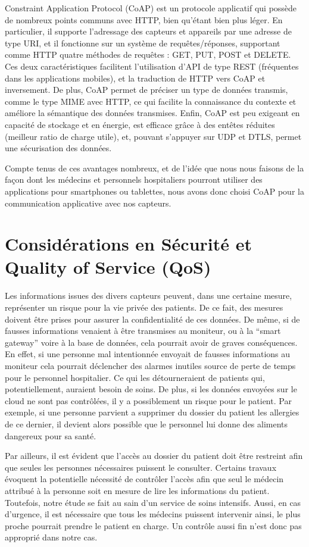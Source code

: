 \documentclass{article}
\begin{document}
Constraint Application Protocol (CoAP) est un protocole applicatif qui possède de nombreux points communs avec HTTP, bien qu’étant bien plus léger. En particulier, il supporte l’adressage des capteurs et appareils par une adresse de type URI, et il fonctionne sur un système de requêtes/réponses, supportant comme HTTP quatre méthodes de requêtes : GET, PUT, POST et DELETE. Ces deux caractéristiques facilitent l’utilisation d’API de type REST (fréquentes dans les applications mobiles), et la traduction de HTTP vers CoAP et inversement. De plus, CoAP permet de préciser un type de données transmis, comme le type MIME avec HTTP, ce qui facilite la connaissance du contexte et améliore la sémantique des données transmises. Enfin, CoAP est peu exigeant en capacité de stockage et en énergie, est efficace grâce à des entêtes réduites (meilleur ratio de charge utile), et, pouvant s’appuyer sur UDP et DTLS, permet une sécurisation des données.

Compte tenus de ces avantages nombreux, et de l’idée que nous nous faisons de la façon dont les médecins et personnels hospitaliers pourront utiliser des applications pour smartphones ou tablettes, nous avons donc choisi CoAP pour la communication applicative avec nos capteurs.

\section {Considérations en Sécurité et Quality of Service (QoS)}

Les informations issues des divers capteurs peuvent, dans une certaine mesure, représenter un risque pour la vie privée des patients. De ce fait, des mesures doivent être prises pour assurer la confidentialité de ces données. De même, si de fausses informations venaient à être transmises au moniteur, ou à la “smart gateway” voire à la base de données, cela pourrait avoir de graves conséquences. En effet, si une personne mal intentionnée envoyait de fausses informations au moniteur cela pourrait déclencher des alarmes inutiles source de perte de temps pour le personnel hospitalier. Ce qui les détourneraient de patients qui, potentiellement, auraient besoin de soins. De plus, si les données envoyées sur le cloud ne sont pas contrôlées, il y a possiblement un risque pour le patient. Par exemple, si une personne parvient a supprimer du dossier du patient les allergies de ce dernier, il devient alors possible que le personnel lui donne des aliments dangereux pour sa santé.

Par ailleurs, il est évident que l’accès au dossier du patient doit être restreint afin que seules les personnes nécessaires puissent le consulter. Certains travaux évoquent la potentielle nécessité de contrôler l’accès afin que seul le médecin attribué à la personne soit en mesure de lire les informations du patient. Toutefois, notre étude se fait au sain d’un service de soins intensifs. Aussi, en cas d’urgence, il est nécessaire que tous les médecins puissent intervenir ainsi, le plus proche pourrait prendre le patient en charge. Un contrôle aussi fin n’est donc pas approprié dans notre cas.
\end{document}

